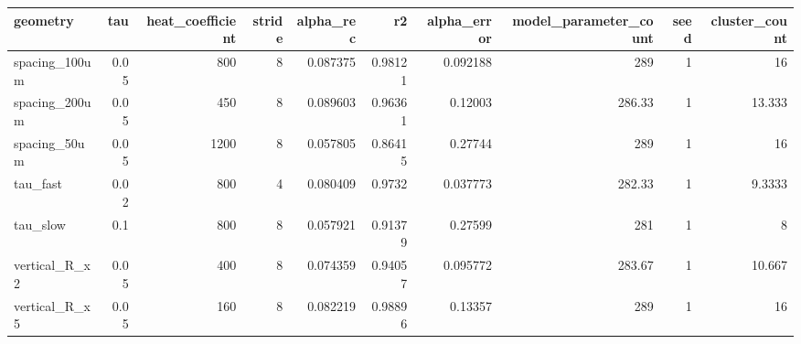 \begin{tabular}{lrrrrrrrrr}
\toprule
geometry & tau & heat\_coefficient & stride & alpha\_rec & r2 & alpha\_error & model\_parameter\_count & seed & cluster\_count \\
\midrule
spacing\_100um & 0.05 & 800 & 8 & 0.087375 & 0.98121 & 0.092188 & 289 & 1 & 16 \\
spacing\_200um & 0.05 & 450 & 8 & 0.089603 & 0.96361 & 0.12003 & 286.33 & 1 & 13.333 \\
spacing\_50um & 0.05 & 1200 & 8 & 0.057805 & 0.86415 & 0.27744 & 289 & 1 & 16 \\
tau\_fast & 0.02 & 800 & 4 & 0.080409 & 0.9732 & 0.037773 & 282.33 & 1 & 9.3333 \\
tau\_slow & 0.1 & 800 & 8 & 0.057921 & 0.91379 & 0.27599 & 281 & 1 & 8 \\
vertical\_R\_x2 & 0.05 & 400 & 8 & 0.074359 & 0.94057 & 0.095772 & 283.67 & 1 & 10.667 \\
vertical\_R\_x5 & 0.05 & 160 & 8 & 0.082219 & 0.98896 & 0.13357 & 289 & 1 & 16 \\
\bottomrule
\end{tabular}
